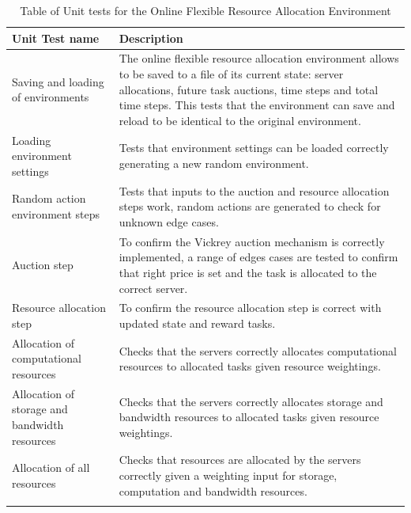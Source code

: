 \begin{longtable}{|p{3cm}|p{11cm}|} \hline
    \textbf{Unit Test name} & \textbf{Description} \\ \hline
    Saving and loading of environments & The online flexible resource allocation environment allows to be saved to a
        file of its current state: server allocations, future task auctions, time steps and total time steps. This
        tests that the environment can save and reload to be identical to the original environment. \\ \hline
    Loading environment settings & Tests that environment settings can be loaded correctly generating a new random
        environment. \\ \hline
    Random action environment steps & Tests that inputs to the auction and resource allocation steps work,
        random actions are generated to check for unknown edge cases.  \\ \hline
    Auction step & To confirm the Vickrey auction mechanism is correctly implemented, a range of edges cases
        are tested to confirm that right price is set and the task is allocated to the correct server. \\ \hline
    Resource allocation step & To confirm the resource allocation step is correct with updated state and reward tasks.
        \\ \hline
    Allocation of computational resources & Checks that the servers correctly allocates computational resources to
        allocated tasks given resource weightings. \\ \hline
    Allocation of storage and bandwidth resources & Checks that the servers correctly allocates storage and
        bandwidth resources to allocated tasks given resource weightings. \\ \hline
    Allocation of all resources & Checks that resources are allocated by the servers correctly given a weighting
        input for storage, computation and bandwidth resources. \\ \hline
    \caption{Table of Unit tests for the Online Flexible Resource Allocation Environment}
    \label{tab:environment-unit-tests}
\end{longtable}

